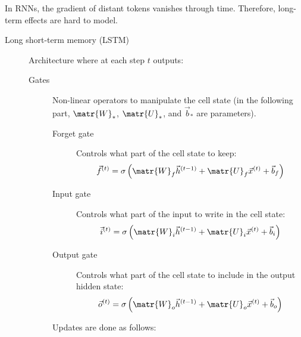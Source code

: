 \begin{remark}
    In RNNs, the gradient of distant tokens vanishes through time. Therefore, long-term effects are hard to model.
\end{remark}

\begin{description}
    \item[Long short-term memory (LSTM)] 
        Architecture where at each step $t$ outputs:

        \begin{description}
            \item[Gates]
                Non-linear operators to manipulate the cell state (in the following part, $\matr{W}_*$, $\matr{U}_*$, and $\vec{b}_*$ are parameters).

                \begin{description}
                    \item[Forget gate] 
                        Controls what part of the cell state to keep:
                        \[ \vec{f}^{(t)} = \sigma\left( \matr{W}_f \vec{h}^{(t-1)} + \matr{U}_f \vec{x}^{(t)} + \vec{b}_f \right) \]

                    \item[Input gate] 
                        Controls what part of the input to write in the cell state:
                        \[ \vec{i}^{(t)} = \sigma\left( \matr{W}_i \vec{h}^{(t-1)} + \matr{U}_i \vec{x}^{(t)} + \vec{b}_i \right) \]

                    \item[Output gate] 
                        Controls what part of the cell state to include in the output hidden state:
                        \[ \vec{o}^{(t)} = \sigma\left( \matr{W}_o \vec{h}^{(t-1)} + \matr{U}_o \vec{x}^{(t)} + \vec{b}_o \right) \]
                    \end{description}

                Updates are done as follows:
        \end{description}


\end{description}
